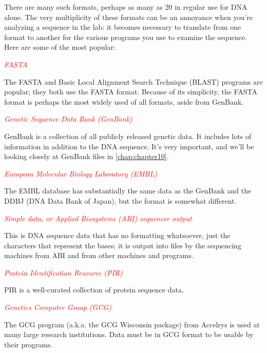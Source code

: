 There are many such formats, perhaps as many as 20 in regular use for DNA alone. The very multiplicity of these formats can be an annoyance when you're analyzing a sequence in the lab: it becomes necessary to translate from one format to another for the various programs you use to examine the sequence. Here are some of the most popular: 

\textcolor{red}{\textit{FASTA}}
\begin{adjustwidth}{2em}{}
The FASTA and Basic Local Alignment Search Technique (BLAST) programs are popular; they both use the FASTA format. Because of its simplicity, the FASTA format is perhaps the most widely used of all formats, aside from GenBank. 
\end{adjustwidth}

\textcolor{red}{\textit{Genetic Sequence Data Bank (GenBank)}}
\begin{adjustwidth}{2em}{}
GenBank is a collection of all publicly released genetic data. It includes lots of information in addition to the DNA sequence. It's very important, and we'll be looking closely at GenBank files in \autoref{chap:chapter10}. 
\end{adjustwidth}

\textcolor{red}{\textit{European Molecular Biology Laboratory (EMBL)}}
\begin{adjustwidth}{2em}{}
The EMBL database has substantially the same data as the GenBank and the DDBJ (DNA Data Bank of Japan), but the format is somewhat different. 
\end{adjustwidth}

\textcolor{red}{\textit{Simple data, or Applied Biosystems (ABI) sequencer output}}
\begin{adjustwidth}{2em}{}
This is DNA sequence data that has no formatting whatsoever, just the characters that represent the bases; it is output into files by the sequencing machines from ABI and from other machines and programs. 
\end{adjustwidth}

\textcolor{red}{\textit{Protein Identification Resource (PIR)}}
\begin{adjustwidth}{2em}{}
PIR is a well-curated collection of protein sequence data.
\end{adjustwidth}

\textcolor{red}{\textit{Genetics Computer Group (GCG)}}
\begin{adjustwidth}{2em}{}
The GCG program (a.k.a. the GCG Wisconsin package) from Accelrys is used at many large research institutions. Data must be in GCG format to be usable by their programs. 
\end{adjustwidth}

